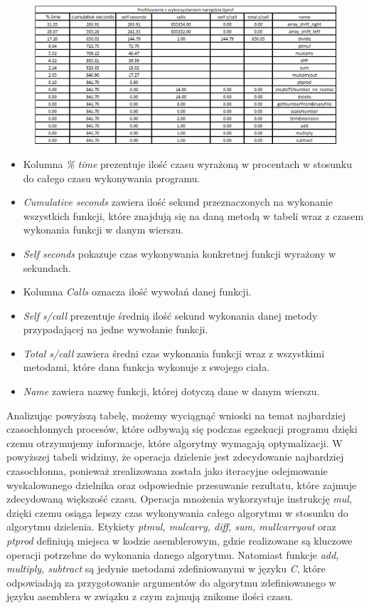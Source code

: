 \documentclass{article}
\begin{document}
\begin{figure}[h!]
\centering
\includegraphics[scale=0.60]{charts/GprofTable.png}

\end{figure}

\begin{itemize}
    \item Kolumna \textit{\% time} prezentuje ilość czasu wyrażoną w procentach w stosunku do całego czasu wykonywania programu.
    \item \textit{Cumulative seconds} zawiera ilość sekund przeznaczonych na wykonanie wszystkich funkcji, które znajdują się na daną metodą w tabeli wraz z czasem wykonania funkcji w danym wierszu.
    \item \textit{Self seconds} pokazuje czas wykonywania konkretnej funkcji wyrażony w sekundach.
    \item Kolumna \textit{Calls} oznacza ilość wywołań danej funkcji.
    \item \textit{Self s/call} prezentuje średnią ilość sekund wykonania danej metody przypadającej na jedne wywołanie funkcji.
    \item \textit{Total s/call} zawiera średni czas wykonania funkcji wraz z wszystkimi metodami, które dana funkcja wykonuje z swojego ciała.
    \item \textit{Name} zawiera nazwę funkcji, której dotyczą dane w danym wierszu.
\end{itemize}

Analizując powyższą tabelę, możemy wyciągnąć wnioski na temat najbardziej czasochłonnych procesów, które odbywają się podczas egzekucji programu dzięki czemu otrzymujemy informacje, które algorytmy wymagają optymalizacji. W powyższej tabeli widzimy, że operacja dzielenie jest zdecydowanie najbardziej czasochłonna, ponieważ zrealizowana została jako iteracyjne odejmowanie wyskalowanego dzielnika oraz odpowiednie przesuwanie rezultatu, które zajmuje zdecydowaną większość czasu. Operacja mnożenia wykorzystuje instrukcję \textit{mul}, dzięki czemu osiąga lepszy czas wykonywania całego algorytmu w stosunku do algorytmu dzielenia. Etykiety \textit{ptmul, mulcarry, diff, sum, mullcarryout} oraz \textit{ptprod} definiują miejsca w kodzie asemblerowym, gdzie realizowane są kluczowe operacji potrzebne do wykonania danego algorytmu. Natomiast funkcje \textit{add, multiply, subtract} są jedynie metodami zdefiniowanymi w języku \textit{C}, które odpowiadają za przygotowanie argumentów do algorytmu zdefiniowanego w języku asemblera w związku z czym zajmują znikome ilości czasu. 
\end{document}
